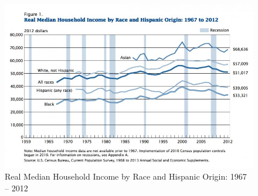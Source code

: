\documentclass[11pt]{asaproc}
\newcommand{\1}{\mathbb{1}}
\begin{document}
\begin{figure}[h!]
\centering
\includegraphics[width=14cm]{figures/Household_Income.png}
\caption[Real Median Household Income]{Real Median Household Income by Race and Hispanic Origin: 1967 -- 2012}
\label{fig:income}
\end{figure}
\end{document}
